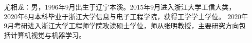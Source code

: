 \cleardoublepage
\vspace{-6mm}
\vspace{5mm}

尤相龙：男，1996年9月出生于辽宁本溪。2015年9月进入浙江大学工信大类，
2020年6月本科毕业于浙江大学信息与电子工程学院，获得工学学士学位。
2020年9月考研进入浙江大学工程师学院攻读硕士学位，师从张明教授，主要研究方向包括计算机视觉与机器学习。
